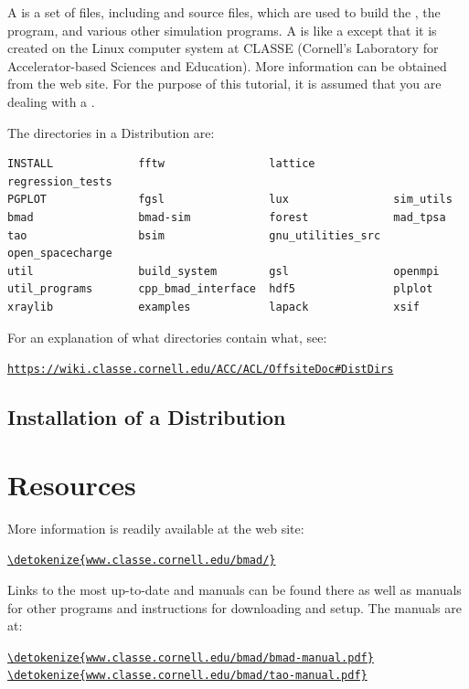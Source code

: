 \documentclass{hitec}     %
\newcommand{\Section}[1]{\section{#1}\vspace*{-1ex}}
\newenvironment{display}
  {\vspace*{-1.5ex} \begin{alltt}}
  {\end{alltt} \vspace*{-1.0ex}}
\begin{document}
A  is a set of files, including \bmad and \tao source files, which are used to
build the \bmad, the \tao program, and various other simulation programs. A  is like a
 except that it is created on the Linux computer system at CLASSE (Cornell's
Laboratory for Accelerator-based Sciences and Education). More information can be obtained from the
\bmad web site. For the purpose of this tutorial, it is assumed that you are dealing with a
.

The directories in a Distribution are:
\begin{lstlisting}[mathescape]
INSTALL             fftw                lattice            regression_tests
PGPLOT              fgsl                lux                sim_utils
bmad                bmad-sim            forest             mad_tpsa
tao                 bsim                gnu_utilities_src  open_spacecharge
util                build_system        gsl                openmpi
util_programs       cpp_bmad_interface  hdf5               plplot
xraylib             examples            lapack             xsif
\end{lstlisting}

For an explanation of what directories contain what, see:
\begin{display}
  \url{https://wiki.classe.cornell.edu/ACC/ACL/OffsiteDoc#DistDirs}
\end{display}

\subsection{Installation of a Distribution}
\label{s:install.dist}


\newpage

\Section{Resources}
\label{s:resources}

More information is readily available at the \bmad web site:
\begin{display}
  \url{\detokenize{www.classe.cornell.edu/bmad/}}
\end{display}
Links to the most up-to-date \bmad and \tao manuals can be found there as well as manuals for other
programs and instructions for downloading and setup. The manuals are at:
\begin{display}
  \url{\detokenize{www.classe.cornell.edu/bmad/bmad-manual.pdf}}
  \url{\detokenize{www.classe.cornell.edu/bmad/tao-manual.pdf}}
\end{display}
\end{document}
